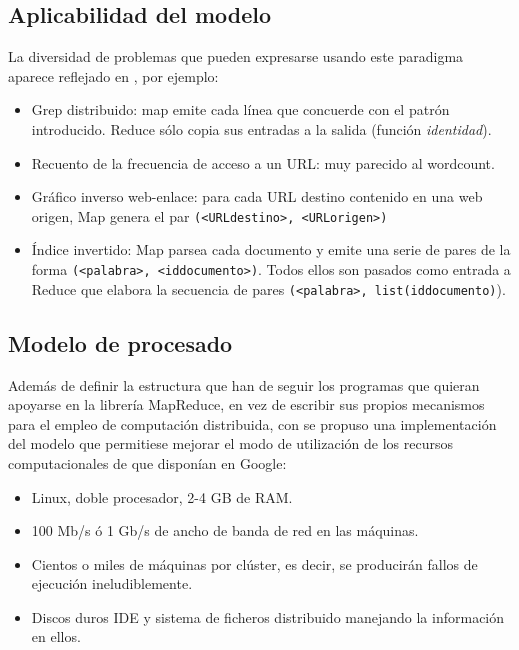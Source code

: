 \subsection{Aplicabilidad del modelo}\label{subsec:aplicabilidad}
\noindent La diversidad de problemas que pueden expresarse usando este paradigma aparece reflejado en \cite{googlemapreduce}, por ejemplo:
\begin{itemize}
 \item Grep distribuido: map emite cada l\'inea que concuerde con el patr\'on introducido. Reduce s\'olo copia sus entradas a la salida (funci\'on \emph{identidad}).
 \item Recuento de la frecuencia de acceso a un URL: muy parecido al wordcount.
 \item Gr\'afico inverso web-enlace: para cada URL destino contenido en una web origen, Map genera el par \texttt{(<URLdestino>, <URLorigen>)}
 \item \'Indice invertido: Map parsea cada documento y emite una serie de pares de la forma \texttt{(<palabra>, <iddocumento>)}. Todos ellos son pasados como entrada a Reduce que elabora la secuencia de pares \texttt{(<palabra>, list(iddocumento)}).
\end{itemize}



\subsection{Modelo de procesado}\label{subsec:processingmodel}
\noindent Adem\'as de definir la estructura que han de seguir los programas que quieran apoyarse en la librer\'ia MapReduce, en vez de escribir sus propios me\-ca\-nis\-mos para el empleo de computaci\'on distribuida, con \cite{googlemapreduce} se propuso una implementaci\'on del modelo que permitiese mejorar el modo de utilizaci\'on de los recursos computacionales de que dispon\'ian en Google:

\begin{itemize}
 \item Linux, doble procesador, 2-4 GB de RAM.
 \item 100 Mb/s \'o 1 Gb/s de ancho de banda de red en las m\'aquinas.
 \item Cientos o miles de m\'aquinas por cl\'uster, es decir, se producir\'an fa\-llos de ejecuci\'on ineludiblemente.
 \item Discos duros IDE y sistema de ficheros distribuido manejando la informaci\'on en ellos.
\end{itemize}

